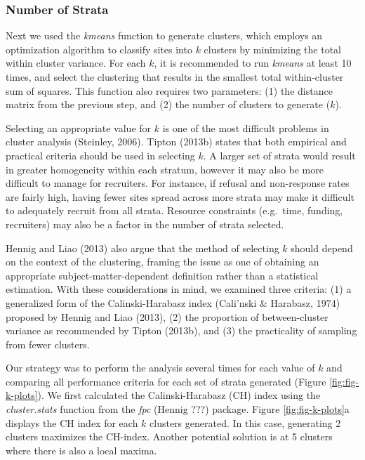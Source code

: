\documentclass[man,floatsintext]{apa6}
\begin{document}
\hypertarget{number-of-strata}{%
\subsubsection{Number of Strata}\label{number-of-strata}}

Next we used the \emph{kmeans} function to generate clusters, which employs an optimization algorithm to classify sites into \(k\) clusters by minimizing the total within cluster variance. For each \(k\), it is recommended to run \emph{kmeans} at least 10 times, and select the clustering that results in the smallest total within-cluster sum of squares. This function also requires two parameters: (1) the distance matrix from the previous step, and (2) the number of clusters to generate (\(k\)).

Selecting an appropriate value for \(k\) is one of the most difficult problems in cluster analysis (Steinley, 2006). Tipton (2013b) states that both empirical and practical criteria should be used in selecting \(k\). A larger set of strata would result in greater homogeneity within each stratum, however it may also be more difficult to manage for recruiters. For instance, if refusal and non-response rates are fairly high, having fewer sites spread across more strata may make it difficult to adequately recruit from all strata. Resource constraints (e.g.~time, funding, recruiters) may also be a factor in the number of strata selected.

Hennig and Liao (2013) also argue that the method of selecting \(k\) should depend on the context of the clustering, framing the issue as one of obtaining an appropriate subject-matter-dependent definition rather than a statistical estimation. With these considerations in mind, we examined three criteria: (1) a generalized form of the Calinski-Harabasz index (Cali\a'nski \& Harabasz, 1974) proposed by Hennig and Liao (2013), (2) the proportion of between-cluster variance as recommended by Tipton (2013b), and (3) the practicality of sampling from fewer clusters.

Our strategy was to perform the analysis several times for each value of \(k\) and comparing all performance criteria for each set of strata generated (Figure \ref{fig:fig-k-plots}). We first calculated the Calinski-Harabasz (CH) index using the \emph{cluster.stats} function from the \emph{fpc} (Hennig ???) package. Figure \ref{fig:fig-k-plots}a displays the CH index for each \(k\) clusters generated. In this case, generating 2 clusters maximizes the CH-index. Another potential solution is at 5 clusters where there is also a local maxima.
\end{document}
